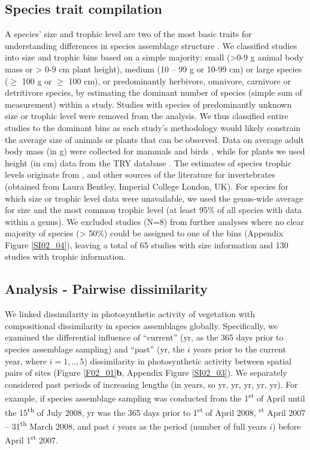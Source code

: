 \subsection{Species trait compilation}
\label{C02_0203}
A species’ size and trophic level are two of the most basic traits for understanding differences in species assemblage structure \citep{Speakman2005,Terborgh2015}. We classified studies into size and trophic bins based on a simple majority: small (>0-9 g animal body mass or > 0-9 cm plant height), medium (10 – 99 g or 10-99 cm) or large species ($\geq$ 100 g or $\geq$ 100 cm), or predominantly herbivore, omnivore, carnivore or detritivore species, by estimating the dominant number of species (simple sum of measurement) within a study. Studies with species of predominantly unknown size or trophic level were removed from the analysis. We thus classified entire studies to the dominant bins as each study’s methodology would likely constrain the average size of animals or plants that can be observed. Data on average adult body mass (in g) were collected for mammals \citep{Jones2009} and birds \citep{Myhrvold2015}, while for plants we used height (in cm) data from the TRY database \citep{Kattge2011}. The estimates of species trophic levels originate from \cite{Kissling2014}, \cite{Wilman2014} and other sources of the literature for invertebrates (obtained from Laura Bentley, Imperial College London, UK). For species for which size or trophic level data were unavailable, we used the genus-wide average for size and the most common trophic level (at least 95\% of all species with data within a genus). We excluded studies (N=8) from further analyses where no clear majority of species (> 50\%) could be assigned to one of the bins (Appendix Figure \ref{SI02_04}), leaving a total of 65 studies with size information and 130 studies with trophic information. 

\subsection{Analysis - Pairwise dissimilarity}
\label{C02_0204}
We linked dissimilarity in photosynthetic activity of vegetation with compositional dissimilarity in species assemblages globally. Specifically, we examined the differential influence of “current” (yr, as the 365 days prior to species assemblage sampling) and “past” (yr, the $i$ years prior to the current year, where $i = 1,..,5$) dissimilarity in photosynthetic activity between spatial pairs of sites (Figure \ref{F02_01}\textbf{b}, Appendix Figure \ref{SI02_03}). We separately considered past periods of increasing lengths (in years, so yr, yr, yr, yr, yr). For example, if species assemblage sampling was conducted from the 1\textsuperscript{st} of April until the 15\textsuperscript{th} of July 2008, yr was the 365 days prior to 1\textsuperscript{st} of April 2008, \textsuperscript{st} April 2007 – 31\textsuperscript{th} March 2008, and past $i$ years as the period (number of full years $i$) before April 1\textsuperscript{st} 2007.


